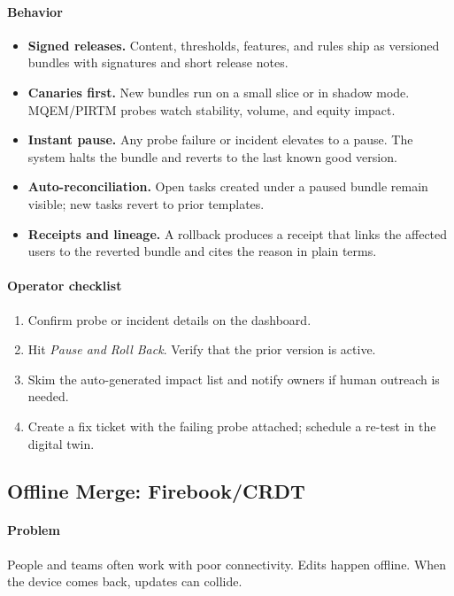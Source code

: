 \documentclass[12pt]{article}
\begin{document}
\paragraph{Behavior}
\begin{itemize}[leftmargin=*]
  \item \textbf{Signed releases.} Content, thresholds, features, and rules ship as versioned bundles with signatures and short release notes.
  \item \textbf{Canaries first.} New bundles run on a small slice or in shadow mode. MQEM/PIRTM probes watch stability, volume, and equity impact.
  \item \textbf{Instant pause.} Any probe failure or incident elevates to a pause. The system halts the bundle and reverts to the last known good version.
  \item \textbf{Auto-reconciliation.} Open tasks created under a paused bundle remain visible; new tasks revert to prior templates.
  \item \textbf{Receipts and lineage.} A rollback produces a receipt that links the affected users to the reverted bundle and cites the reason in plain terms.
\end{itemize}

\paragraph{Operator checklist}
\begin{enumerate}[leftmargin=*]
  \item Confirm probe or incident details on the dashboard.
  \item Hit \emph{Pause and Roll Back}. Verify that the prior version is active.
  \item Skim the auto-generated impact list and notify owners if human outreach is needed.
  \item Create a fix ticket with the failing probe attached; schedule a re-test in the digital twin.
\end{enumerate}

\subsection*{Offline Merge: Firebook/CRDT}
\paragraph{Problem}
People and teams often work with poor connectivity. Edits happen offline. When the device comes back, updates can collide.
\end{document}
